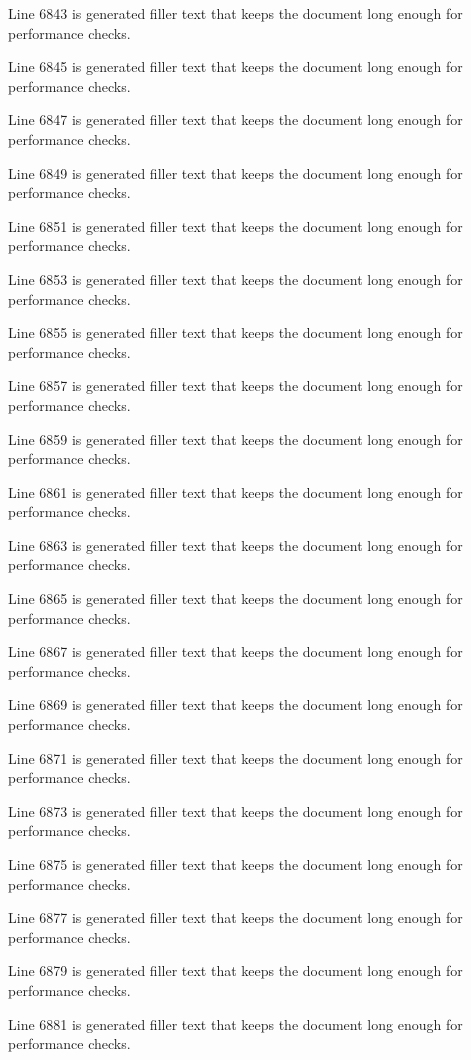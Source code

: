 Line 6843 is generated filler text that keeps the document long enough for performance checks.

Line 6845 is generated filler text that keeps the document long enough for performance checks.

Line 6847 is generated filler text that keeps the document long enough for performance checks.

Line 6849 is generated filler text that keeps the document long enough for performance checks.

Line 6851 is generated filler text that keeps the document long enough for performance checks.

Line 6853 is generated filler text that keeps the document long enough for performance checks.

Line 6855 is generated filler text that keeps the document long enough for performance checks.

Line 6857 is generated filler text that keeps the document long enough for performance checks.

Line 6859 is generated filler text that keeps the document long enough for performance checks.

Line 6861 is generated filler text that keeps the document long enough for performance checks.

Line 6863 is generated filler text that keeps the document long enough for performance checks.

Line 6865 is generated filler text that keeps the document long enough for performance checks.

Line 6867 is generated filler text that keeps the document long enough for performance checks.

Line 6869 is generated filler text that keeps the document long enough for performance checks.

Line 6871 is generated filler text that keeps the document long enough for performance checks.

Line 6873 is generated filler text that keeps the document long enough for performance checks.

Line 6875 is generated filler text that keeps the document long enough for performance checks.

Line 6877 is generated filler text that keeps the document long enough for performance checks.

Line 6879 is generated filler text that keeps the document long enough for performance checks.

Line 6881 is generated filler text that keeps the document long enough for performance checks.

